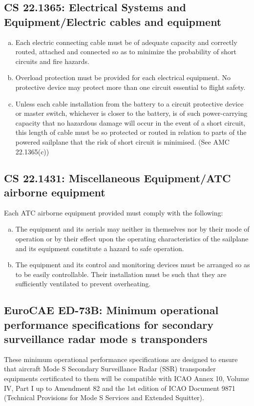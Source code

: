 \documentclass{article}
\begin{document}
\subsection{CS 22.1365:  Electrical Systems and Equipment/Electric cables and equipment}
\begin{enumerate}[(a)] 
\item Each electric connecting cable must be of adequate capacity and correctly routed, attached and connected so as to minimize the probability of short circuits and fire hazards.
\item Overload protection must be provided for each electrical equipment. No protective device may protect more than one circuit essential to flight safety.
\item Unless each cable installation from the battery to a circuit protective device or master switch, whichever is closer to the battery, is of such power-carrying capacity that no hazardous damage will occur in the event of a short circuit, this length of cable must be so protected or routed in relation to parts of the powered sailplane that the risk of short circuit is minimised. (See AMC 22.1365(c))
\end{enumerate}

\subsection{CS 22.1431:  Miscellaneous Equipment/ATC airborne equipment}
Each ATC airborne equipment provided must comply with the following:
\begin{enumerate}[(a)]
\item The equipment and its aerials may neither in themselves nor by their mode of operation or by their effect upon the operating characteristics of the sailplane and its equipment constitute a hazard to safe operation.
\item The equipment and its control and monitoring devices must be arranged so as to be easily controllable. Their installation must be such that they are sufficiently ventilated to prevent overheating.
\end{enumerate}


\subsection{EuroCAE ED-73B: Minimum operational performance specifications for secondary surveillance radar mode s transponders}
These minimum operational performance specifications are designed to ensure that aircraft Mode S Secondary Surveillance Radar (SSR) transponder equipments certificated to them will be compatible with ICAO Annex 10, Volume IV, Part I up to Amendment 82 and the 1st edition of ICAO Document 9871 (Technical Provisions for Mode S Services and Extended Squitter). 
\end{document}
